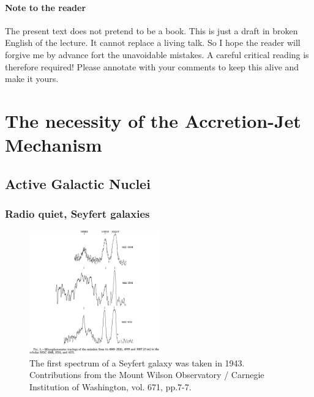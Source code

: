 \documentclass[10pt,a4paper,english]{article}
\begin{document}

\paragraph{Note to the reader}
The present text does not pretend to be a book. This is just a draft in broken
English of the lecture. It cannot replace a living talk. So I hope the reader
will forgive me by advance fort the unavoidable mistakes. A careful critical
reading is therefore required! Please annotate with your comments to keep this
alive and make it yours.

\tableofcontents

\newpage
{} %

\section{The necessity of the Accretion-Jet Mechanism}

\subsection{Active Galactic Nuclei}

\subsubsection{Radio quiet, Seyfert galaxies}

\begin{figure}[!ht]
    \centering
    \includegraphics[width=0.5\textwidth]{1943CMWCI-671-7.jpg}
    \caption{
        The first spectrum of a Seyfert galaxy was taken in 1943. Contributions
        from the Mount Wilson Observatory / Carnegie Institution of Washington,
        vol. 671, pp.7-7.
    }
\end{figure}
\end{document}
